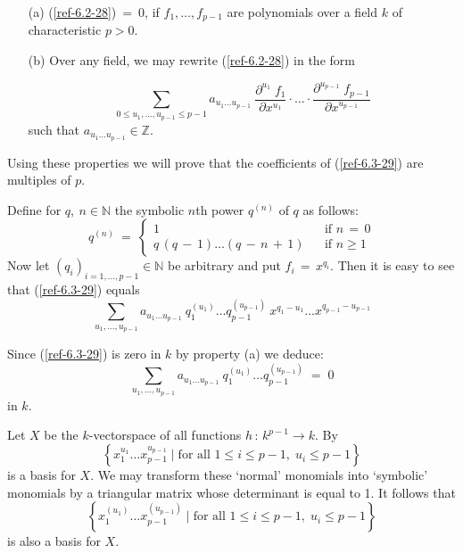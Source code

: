 \documentclass{amsart}
\numberwithin{equation}{section}
\let\blb\mathbb
\def \ZZ{{\blb Z}}
\def \NN{{\blb N}}
\theoremstyle{definition}
\theoremstyle{remark}
\begin{document}
\begin{enumerate}
    
    \item[(a)] (\ref{ref-6.2-28})$\:=\:0$, if $f_{1}, \ldots ,f_{p-1}$ are 
    polynomials over a field $k$ of characteristic $p >0$.
    
    \item[(b)] Over any field, we may rewrite (\ref{ref-6.2-28}) in the form
    
    \begin{equation} \label{ref-6.3-29}
        \sum_{0\le u_{1}, \ldots ,u_{p-1}\le p-1} a_{u_{1} \ldots u_{p-1}} \: 
        \frac{\partial^{u_{1}} \; f_{1}}{\partial x^{u_{1}}} \cdot \ldots 
        \cdot \frac{\partial^{u_{p-1}} \; f_{p-1}}{\partial x^{u_{p-1}}}
    \end{equation}
    such that $a_{u_{1} 
    \ldots u_{p-1}} \in \ZZ$.
\end{enumerate}    
    
Using these properties we will prove that the coefficients of 
(\ref{ref-6.3-29}) are multiples of $p$.

Define for  $q,\: n \in \NN$ the symbolic $n$th 
power $q^{(n)}$ of $q$ as follows:
\[q^{(n)} \:=\: \left\{ \begin{array}{lll} 1 & & \mbox{if } n\,=\,0 \\
q \, (q\,-\,1) \ldots (q\,-\,n\,+\,1) & & \mbox{if } n \geq 1 
\end{array} \right. \]
Now let $(q_i)_{i=1,\ldots,p-1}\in \NN$ be arbitrary and put $f_{i} \,=\,
x^{q_{i}}$.
Then it is easy to see that 
(\ref{ref-6.3-29}) equals 
\[\sum_{u_{1}, \ldots ,u_{p-1}} a_{u_{1} \ldots u_{p-1}} \: 
q_{1}^{(u_{1})} \ldots q_{p-1}^{(u_{p-1})} \: x^{q_{1}-u_{1}} \ldots 
x^{q_{p-1}-u_{p-1}}\]

Since (\ref{ref-6.3-29}) is zero in $k$ by  property (a) we 
deduce:
\begin{equation} \label{ref-6.4-30}
    \sum_{u_{1}, \ldots ,u_{p-1}} a_{u_{1} \ldots u_{p-1}} \: 
    q_{1}^{(u_{1})} \ldots q_{p-1}^{(u_{p-1})} \;=\; 0
\end{equation}
in $k$.

Let $X$ be the $k$-vectorspace of all functions 
$h \,:\, k^{p-1} \rightarrow k$. By \cite{BS}
\[
\left\{ x_{1}^{u_{1}} \ldots x_{p-1}^{u_{p-1}} \; | \; \mbox{for all } 
1 \leq i \leq p-1, \; u_{i} \leq p-1 \right\}
\]
 is a basis for $X$. 
We may transform these `normal' monomials into 
`symbolic' monomials by a triangular matrix whose determinant is equal 
to 1. It follows that
\[\left\{ x_{1}^{(u_{1})} \ldots x_{p-1}^{(u_{p-1})} \; | \; 
\mbox{for all } 1 \leq i \leq p-1, \; u_{i} \leq p-1 \right\}
\]
is also 
a basis for $X$.
\end{document}
